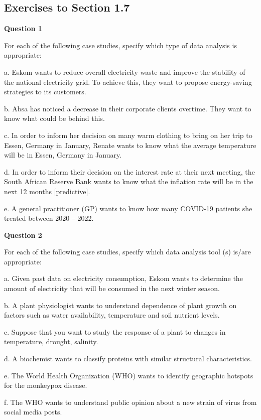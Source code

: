 \documentclass[
]{book}
\begin{document}
\subsection{Exercises to Section 1.7}\label{exercises-to-section-1.7}

\textbf{Question 1}

For each of the following case studies, specify which type of data analysis is appropriate:

a. Eskom wants to reduce overall electricity waste and improve the stability of the national electricity grid. To achieve this, they want to propose energy-saving strategies to its customers.

b. Absa has noticed a decrease in their corporate clients overtime. They want to know what could be behind this.

c. In order to inform her decision on many warm clothing to bring on her trip to Essen, Germany in January, Renate wants to know what the average temperature will be in Essen, Germany in January.

d. In order to inform their decision on the interest rate at their next meeting, the South African Reserve Bank wants to know what the inflation rate will be in the next 12 months {[}predictive{]}.

e. A general practitioner (GP) wants to know how many COVID-19 patients she treated between 2020 -- 2022.

\textbf{Question 2}

For each of the following case studies, specify which data analysis tool (s) is/are appropriate:

a. Given past data on electricity consumption, Eskom wants to determine the amount of electricity that will be consumed in the next winter season.

b. A plant physiologist wants to understand dependence of plant growth on factors such as water availability, temperature and soil nutrient levels.

c. Suppose that you want to study the response of a plant to changes in temperature, drought, salinity.

d. A biochemist wants to classify proteins with similar structural characteristics.

e. The World Health Organization (WHO) wants to identify geographic hotspots for the monkeypox disease.

f. The WHO wants to understand public opinion about a new strain of virus from social media posts.
\end{document}
